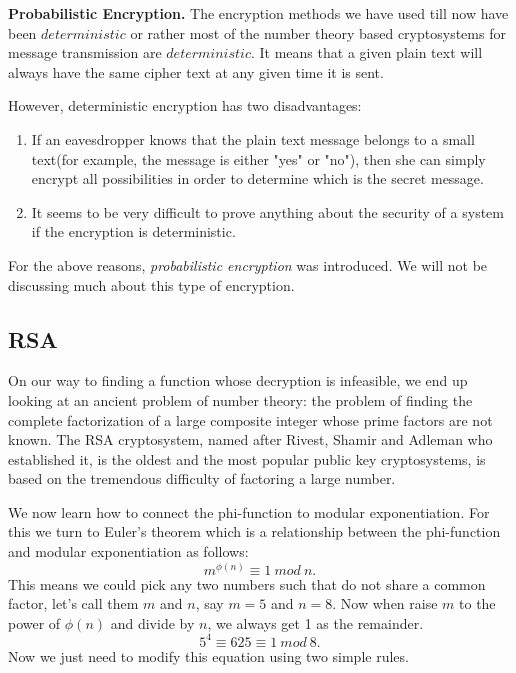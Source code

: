 \documentclass[12pt]{article}
\begin{document}
\textbf{Probabilistic Encryption.}
The encryption methods we have used till now have been $deterministic$ or rather most of the number theory based cryptosystems for message transmission are $deterministic$. It means that a given plain text will always have the same cipher text at any given time it is sent.

However, deterministic encryption has two disadvantages:

\begin{enumerate}
\item If an eavesdropper knows that the plain text message belongs to a small text(for example, the message is either "yes" or "no"), then she can simply encrypt all possibilities in order to determine which is the secret message.
\item It seems to be very difficult to prove anything about the security of a system if the encryption is deterministic.
\end{enumerate}
For the above reasons, \textit{probabilistic encryption} was introduced. We will not be discussing much about this type of encryption.

         \subsection{RSA}
On our way to finding a function whose decryption is infeasible, we end up looking at an ancient problem of number theory:  the problem of finding the complete factorization of a large composite integer whose prime factors are not known. The RSA cryptosystem, named after Rivest, Shamir and Adleman who established it, is the oldest and the most popular public key cryptosystems, is based on the tremendous difficulty of factoring a large number.

We now learn how to connect the phi-function to modular exponentiation. For this we turn to Euler's theorem which is a relationship between the phi-function and modular exponentiation as follows:
$$m^{\phi(n)} \equiv 1 \: mod \: n.$$
This means we could pick any two numbers such that do not share a common factor, let's call them $m$ and $n$, say $m=5$ and $n=8$. Now when raise $m$ to the power of $\phi(n)$ and divide by $n$, we always get 1 as the remainder.
$$5^4 \equiv 625 \equiv 1 \: mod \: 8.$$
Now we just need to modify this equation using two simple rules.
\end{document}

